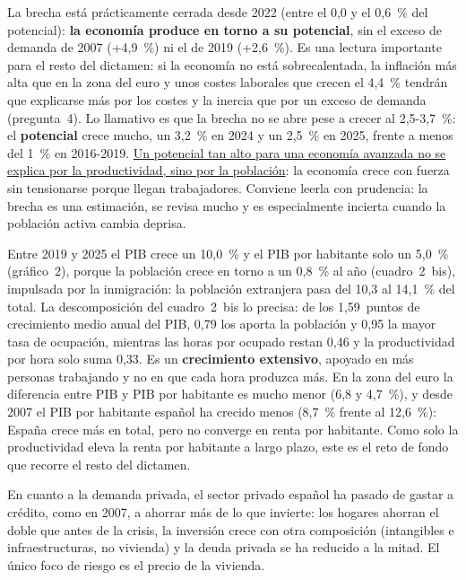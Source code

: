 \begin{examen}
La brecha está prácticamente cerrada desde 2022 (entre el 0,0 y el 0,6~\% del potencial): \textbf{la economía produce en torno a su potencial}, sin el exceso de demanda de 2007 (+4,9~\%) ni el de 2019 (+2,6~\%). Es una lectura importante para el resto del dictamen: si la economía no está sobrecalentada, la inflación más alta que en la zona del euro y unos costes laborales que crecen el 4,4~\% tendrán que explicarse más por los costes y la inercia que por un exceso de demanda (pregunta~4). Lo llamativo es que la brecha no se abre pese a crecer al 2,5-3,7~\%: el \textbf{potencial} crece mucho, un 3,2~\% en 2024 y un 2,5~\% en 2025, frente a menos del 1~\% en 2016-2019. \uline{Un potencial tan alto para una economía avanzada no se explica por la productividad, sino por la población}: la economía crece con fuerza sin tensionarse porque llegan trabajadores. Conviene leerla con prudencia: la brecha es una estimación, se revisa mucho y es especialmente incierta cuando la población activa cambia deprisa.

Entre 2019 y 2025 el PIB crece un 10,0~\% y el PIB por habitante solo un 5,0~\% (gráfico~2), porque la población crece en torno a un 0,8~\% al año (cuadro~2~bis), impulsada por la inmigración: la población extranjera pasa del 10,3 al 14,1~\% del total. La descomposición del cuadro~2~bis lo precisa: de los 1,59~puntos de crecimiento medio anual del PIB, 0,79 los aporta la población y 0,95 la mayor tasa de ocupación, mientras las horas por ocupado restan 0,46 y la productividad por hora solo suma 0,33. Es un \textbf{crecimiento extensivo}, apoyado en más personas trabajando y no en que cada hora produzca más. En la zona del euro la diferencia entre PIB y PIB por habitante es mucho menor (6,8 y 4,7~\%), y desde 2007 el PIB por habitante español ha crecido menos (8,7~\% frente al 12,6~\%): España crece más en total, pero no converge en renta por habitante. Como solo la productividad eleva la renta por habitante a largo plazo, este es el reto de fondo que recorre el resto del dictamen.

En cuanto a la demanda privada, el sector privado español ha pasado de gastar a crédito, como en 2007, a ahorrar más de lo que invierte: los hogares ahorran el doble que antes de la crisis, la inversión crece con otra composición (intangibles e infraestructuras, no vivienda) y la deuda privada se ha reducido a la mitad. El único foco de riesgo es el precio de la vivienda.


\end{examen}
